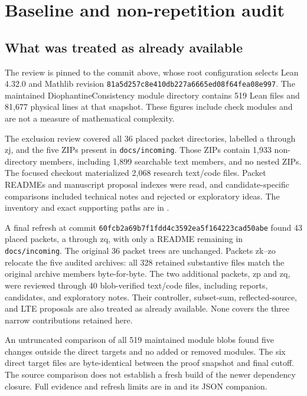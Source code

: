 \documentclass[11pt,letterpaper]{article}
\newcommand{\code}[1]{\texttt{\small #1}}
\begin{document}
\section{Baseline and non-repetition audit}

\subsection{What was treated as already available}

The review is pinned to the commit above, whose root configuration selects Lean 4.32.0 and Mathlib revision \code{81a5d257c8e410db227a6665ed08f64fea08e997}. The maintained DiophantineConsistency module directory contains 519 Lean files and 81,677 physical lines at that snapshot. These figures include check modules and are not a measure of mathematical complexity.

The exclusion review covered all 36 placed packet directories, labelled a through zj, and the five ZIPs present in \code{docs/incoming}. Those ZIPs contain 1,933 non-directory members, including 1,899 searchable text members, and no nested ZIPs. The focused checkout materialized 2,068 research text/code files. Packet READMEs and manuscript proposal indexes were read, and candidate-specific comparisons included technical notes and rejected or exploratory ideas. The inventory and exact supporting paths are in .

A final refresh at commit \code{60fcb2a69b7f1fdd4c3592ea5f164223cad50abe} found 43 placed packets, a through zq, with only a README remaining in \code{docs/incoming}. The original 36 packet trees are unchanged. Packets zk--zo relocate the five audited archives: all 328 retained substantive files match the original archive members byte-for-byte. The two additional packets, zp and zq, were reviewed through 40 blob-verified text/code files, including reports, candidates, and exploratory notes. Their controller, subset-sum, reflected-source, and LTE proposals are also treated as already available. None covers the three narrow contributions retained here.

An untruncated comparison of all 519 maintained module blobs found five changes outside the direct targets and no added or removed modules. The six direct target files are byte-identical between the proof snapshot and final cutoff. The source comparison does not establish a fresh build of the newer dependency closure. Full evidence and refresh limits are in  and its JSON companion.
\end{document}
